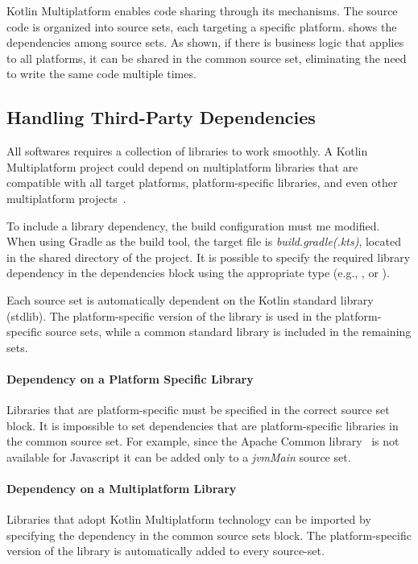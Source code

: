 Kotlin Multiplatform enables code sharing through its mechanisms. The source code is organized into source sets, each targeting a specific platform.  shows the dependencies among source sets. As shown, if there is business logic that applies to all platforms, it can be shared in the common source set, eliminating the need to write the same code multiple times.


\subsection{Handling Third-Party Dependencies}
\label{ssec:handling-third-party-dependencies}
All softwares requires a collection of libraries to work smoothly. A Kotlin Multiplatform project could depend on multiplatform libraries that are compatible with all target platforms, platform-specific libraries, and even other multiplatform projects~\cite{Addingde33:online}.\newline

To include a library dependency, the build configuration must me modified. When using Gradle as the build tool, the target file is \textit{build.gradle(.kts)}, located in the shared directory of the project. It is possible to specify the required library dependency in the dependencies block using the appropriate type (e.g., , or ).\newline

Each source set is automatically dependent on the Kotlin standard library (stdlib). The platform-specific version of the library is used in the platform-specific source sets, while a common standard library is included in the remaining sets.

\paragraph{Dependency on a Platform Specific Library} Libraries that are platform-specific must be specified in the correct source set block. It is impossible to set dependencies that are platform-specific libraries in the common source set. For example, since the Apache Common library~\cite{ApacheCo51:online} is not available for Javascript it can be added only to a \textit{jvmMain} source set.

\paragraph{Dependency on a Multiplatform Library} Libraries that adopt Kotlin Multiplatform technology can be imported by specifying the dependency in the common source sets block. The platform-specific version of the library is automatically added to every source-set.

